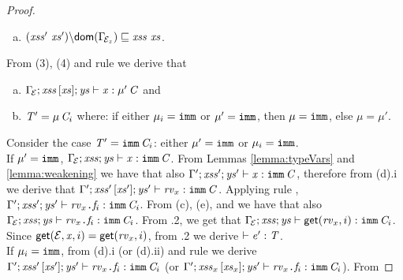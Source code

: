 {\begin{proof}
\begin{enumerate} [(a)]
\begin{enumerate}[i]
\item $\AuxTypeCheck{\Gamma'}{\LentLocked'}{\MutGroup'}{\StronglyLocked'}{{\stVal_x}}{{\Gamma'}({x})}$ if $\mu_x\not=\lent$
\item $\AuxTypeCheck{\Gamma'}{\LentLocked_x}{\MutGroup_x}{\StronglyLocked'}{\stVal_x}{{\Gamma'}({x})}$ if $\mu_x=\lent$ and $\LentLocked'\ \xs'=\LentLocked_x\ \xs_x$ where $\x\in\xs_x$
\end{enumerate}
\item $\LessEq{(\LentLocked'\ \xs'){\setminus}\dom{\TypeEnv{\ctx_z}}}{\LentLocked\ \xs}$.
\end{enumerate}
From (3), (4) and rule  we derive that 
\begin{enumerate} [(a)]\addtocounter{enumi}{5}
 \item ${\Gamma_{\!{\cal{E}}}};\mathit{xss}\,[\mathit{xs}];\mathit{ys}\vdash \mathit{x}:\mu'\,\mathit{C}$ and
  \item $\mathit{T}'=\mu\,\mathit{C}_i$ where: if either $\mu_i=\texttt{imm}$ or $\mu'=\texttt{imm}$, then $\mu=\texttt{imm}$, else $\mu=\mu'$.
\end{enumerate}
Consider the case \underline{$\mathit{T}'=\texttt{imm}\,\mathit{C}_i$}: either $\mu'=\texttt{imm}$ or $\mu_i=\texttt{imm}$.\\
If \underline{$\mu'=\texttt{imm}$}, ${\Gamma_{\!{\cal{E}}}};\mathit{xss};\mathit{ys}\vdash \mathit{x}:\texttt{imm}\,\mathit{C}$. From Lemmas \ref{lemma:typeVars} and \ref{lemma:weakening} we have that also ${\Gamma'};\mathit{xss}';\mathit{ys}'\vdash \mathit{x}:\texttt{imm}\,\mathit{C}$, therefore from (d).i we derive that
$\Gamma';\mathit{xss}'\,[\mathit{xs}'];\mathit{ys}'\vdash {\mathit{rv}_x}:\texttt{imm}\,\mathit{C}$. 
Applying rule ,
$\Gamma';\mathit{xss}';\mathit{ys}'\vdash \mathit{rv}_x\texttt{.}\mathit{f}_i:\texttt{imm}\,\mathit{C}_i$.
From (c), (e), and  we have that also 
$\Gamma_{\!{\cal{E}}};\mathit{xss};\mathit{ys}\vdash \mathit{rv}_x\texttt{.}\mathit{f}_i:\texttt{imm}\,\mathit{C}_i$.
From .2, we get that
$\Gamma_{\!{\cal{E}}};\mathit{xss};\mathit{ys}\vdash \textsf{get}(\mathit{rv}_x,i):\texttt{imm}\,\mathit{C}_i$. Since 
$\textsf{get}({\cal{E}},\mathit{x},i)=\textsf{get}(\mathit{rv}_x,i)$, from .2 we derive $\vdash \mathit{e}':\mathit{T}$.\\
If \underline{$\mu_i=\texttt{imm}$}, from (d).i (or (d).ii) and rule  we derive
$\Gamma';\mathit{xss}'\,[\mathit{xs}'];\mathit{ys}'\vdash \mathit{rv}_x\texttt{.}\mathit{f}_i:\texttt{imm}\,\mathit{C}_i$
(or $\Gamma';\mathit{xss}_x\,[\mathit{xs}_x];\mathit{ys}'\vdash \mathit{rv}_x\texttt{.}\mathit{f}_i:\texttt{imm}\,\mathit{C}_i$). From 

\end{proof}}
